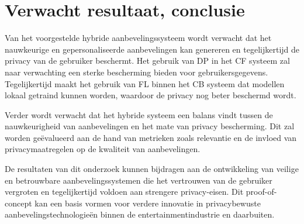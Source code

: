 \section{Verwacht resultaat, conclusie}%
\label{sec:verwachte_resultaten}

Van het voorgestelde hybride aanbevelingssysteem wordt verwacht dat het nauwkeurige en gepersonaliseerde aanbevelingen kan genereren en tegelijkertijd de privacy van de gebruiker beschermt. Het gebruik van DP in het CF systeem zal naar verwachting een sterke bescherming bieden voor gebruikersgegevens. Tegelijkertijd maakt het gebruik van FL binnen het CB systeem dat modellen lokaal getraind kunnen worden, waardoor de privacy nog beter beschermd wordt.

Verder wordt verwacht dat het hybride systeem een balans vindt tussen de nauwkeurigheid van aanbevelingen en het mate van privacy bescherming. Dit zal worden geëvalueerd aan de hand van metrieken zoals relevantie en de invloed van privacymaatregelen op de kwaliteit van aanbevelingen.

De resultaten van dit onderzoek kunnen bijdragen aan de ontwikkeling van veilige en betrouwbare aanbevelingssystemen die het vertrouwen van de gebruiker vergroten en tegelijkertijd voldoen aan strengere privacy-eisen. Dit proof-of-concept kan een basis vormen voor verdere innovatie in privacybewuste aanbevelingstechnologieën binnen de entertainmentindustrie en daarbuiten.
